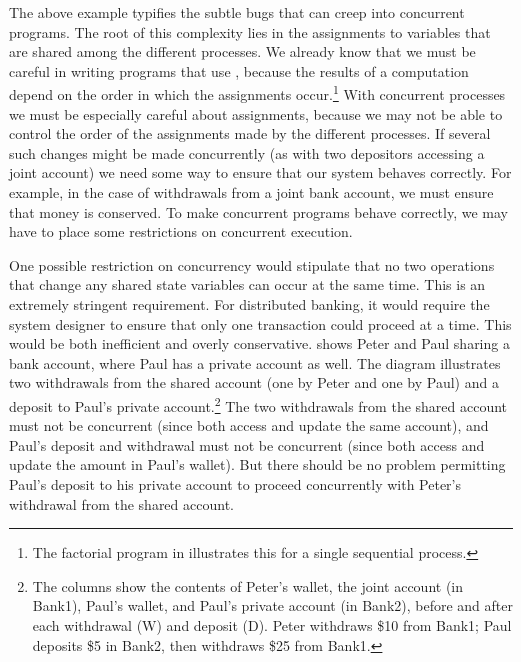 The above example typifies the subtle bugs that can creep into concurrent
programs.  The root of this complexity lies in the assignments to variables
that are shared among the different processes.  We already know that we must be
careful in writing programs that use , because the results of a
computation depend on the order in which the assignments occur.\footnote{The
factorial program in  illustrates this for a single
sequential process.}  With concurrent processes we must be especially careful
about assignments, because we may not be able to control the order of the
assignments made by the different processes.  If several such changes might be
made concurrently (as with two depositors accessing a joint account) we need
some way to ensure that our system behaves correctly.  For example, in the case
of withdrawals from a joint bank account, we must ensure that money is
conserved.  To make concurrent programs behave correctly, we may have to place
some restrictions on concurrent execution.

One possible restriction on concurrency would stipulate that no two operations
that change any shared state variables can occur at the same time.  This is an
extremely stringent requirement.  For distributed banking, it would require the
system designer to ensure that only one transaction could proceed at a time.
This would be both inefficient and overly conservative.  
shows Peter and Paul sharing a bank account, where Paul has a private account
as well.  The diagram illustrates two withdrawals from the shared account (one
by Peter and one by Paul) and a deposit to Paul's private account.\footnote{The
columns show the contents of Peter's wallet, the joint account (in Bank1),
Paul's wallet, and Paul's private account (in Bank2), before and after each
withdrawal (W) and deposit (D).  Peter withdraws \$10 from Bank1; Paul deposits
\$5 in Bank2, then withdraws \$25 from Bank1.}  The two withdrawals from the
shared account must not be concurrent (since both access and update the same
account), and Paul's deposit and withdrawal must not be concurrent (since both
access and update the amount in Paul's wallet).  But there should be no problem
permitting Paul's deposit to his private account to proceed concurrently with
Peter's withdrawal from the shared account.

